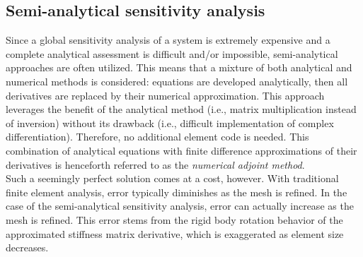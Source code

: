 \subsection{Semi-analytical sensitivity analysis}
Since a global sensitivity analysis of a system is extremely expensive and a complete analytical assessment is difficult and/or impossible, semi-analytical approaches are often utilized. This means that a mixture of both analytical and numerical methods is considered: equations are developed analytically, then all derivatives are replaced by their numerical approximation.\cite{optimization_Bletzinger} This approach leverages the benefit of the analytical method (i.e., matrix multiplication instead of inversion) without its drawback (i.e., difficult implementation of complex differentiation). Therefore, no additional element code is needed. This combination of analytical equations with finite difference approximations of their derivatives is henceforth referred to as the \textit{numerical adjoint method}. \\[3pt]
Such a seemingly perfect solution comes at a cost, however. With traditional finite element analysis, error typically diminishes as the mesh is refined. In the case of the semi-analytical sensitivity analysis, error can actually increase as the mesh is refined. This error stems from the rigid body rotation behavior of the approximated stiffness matrix derivative, which is exaggerated as element size decreases.\cite{optimization_Bletzinger}

